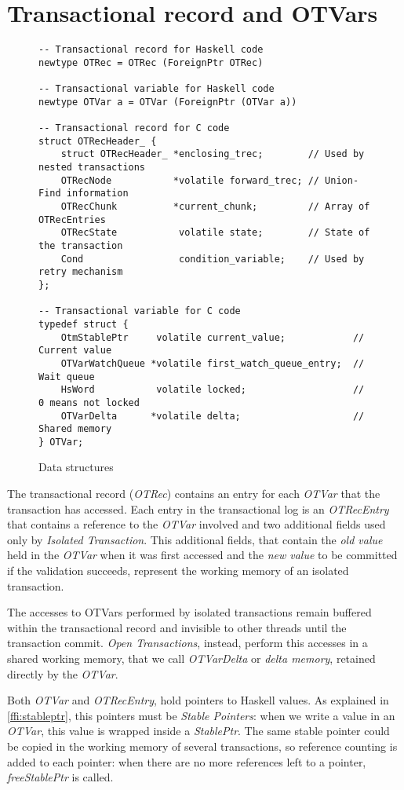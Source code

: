\section{Transactional record and OTVars}
\begin{figure}[t]
\begin{lstlisting}
-- Transactional record for Haskell code
newtype OTRec = OTRec (ForeignPtr OTRec)

-- Transactional variable for Haskell code
newtype OTVar a = OTVar (ForeignPtr (OTVar a))

-- Transactional record for C code
struct OTRecHeader_ {
    struct OTRecHeader_ *enclosing_trec;        // Used by nested transactions
    OTRecNode           *volatile forward_trec; // Union-Find information
    OTRecChunk          *current_chunk;         // Array of OTRecEntries
    OTRecState           volatile state;        // State of the transaction
    Cond                 condition_variable;    // Used by retry mechanism
};

-- Transactional variable for C code
typedef struct {
    OtmStablePtr     volatile current_value;            // Current value
    OTVarWatchQueue *volatile first_watch_queue_entry;  // Wait queue
    HsWord           volatile locked;                   // 0 means not locked
    OTVarDelta      *volatile delta;                    // Shared memory
} OTVar;
\end{lstlisting}
\caption{Data structures}
\vspace{-8pt}
\end{figure}
The transactional record (\emph{OTRec}) contains an entry for each \emph{OTVar} that the transaction has accessed.
Each entry in the transactional log is an \emph{OTRecEntry} that contains a reference to the \emph{OTVar} involved and two additional fields used only by \emph{Isolated Transaction}.
This additional fields, that contain the \emph{old value} held in the \emph{OTVar} when it was first accessed and the \emph{new value} to be committed if the validation succeeds, represent the working memory of an isolated transaction.

The accesses to OTVars performed by isolated transactions remain buffered within the transactional record and invisible to other threads until the transaction commit. \emph{Open Transactions}, instead, perform this accesses in a shared working memory, that we call \emph{OTVarDelta} or \emph{delta memory}, retained directly by the \emph{OTVar}.

Both \emph{OTVar} and \emph{OTRecEntry}, hold pointers to Haskell values.
As explained in \cref{ffi:stableptr}, this pointers must be \emph{Stable Pointers}: when we write a value in an \emph{OTVar}, this value is wrapped inside a \emph{StablePtr}.
The same stable pointer could be copied in the working memory of several transactions, so reference counting is added to each pointer: when there are no more references left to a pointer, \emph{freeStablePtr} is called.

